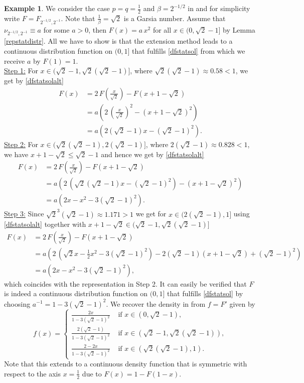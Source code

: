 \documentclass[12pt]{amsart}
\theoremstyle{definition}
\newtheorem{example}[theorem]{Example}
\theoremstyle{remark}
\numberwithin{equation}{section}
\begin{document}
\begin{example}\label{exsymm}
We consider the case $p=q=\frac12$ and $\beta=2^{-1/2}$ in \cite{Sol2} and for simplicity write $F=F_{2^{-1/2},2^{-1}}$. Note that $\frac1{\beta}=\sqrt{2}$ is a Garsia number. Assume that $\nu_{2^{-1/2},2^{-1}}\equiv a$ for some $a>0$, then $F(x)=a\,x^2$ for all $x\in(0,\sqrt{2}-1]$ by Lemma \ref{repstatdistr}. All we have to show is that the extension method leads to a continuous distribution function on $(0,1]$ that fulfills \eqref{dfstatsol} from which we receive $a$ by $F(1)=1$.\\
\underline{Step 1:} For $x\in(\sqrt{2}-1,\sqrt{2}(\sqrt{2}-1)]$, where $\sqrt{2}(\sqrt{2}-1)\approx 0.58<1$, we get by \eqref{dfstatsolalt}
\begin{align*}
F(x) & =2\,F(\tfrac{x}{\sqrt{2}})-F(x+1-\sqrt{2})\\
& =a\left(2\,(\tfrac{x}{\sqrt{2}})^2-(x+1-\sqrt{2})^2\right)\\
& =a\left(2(\sqrt{2}-1)x-(\sqrt{2}-1)^2\right).
\end{align*}
\underline{Step 2:} For $x\in(\sqrt{2}(\sqrt{2}-1),2(\sqrt{2}-1)]$, where $2(\sqrt{2}-1)\approx 0.828<1$, we have $x+1-\sqrt{2}\leq\sqrt{2}-1$ and hence we get by \eqref{dfstatsolalt}
\begin{align*}
F(x) & =2\,F(\tfrac{x}{\sqrt{2}})-F(x+1-\sqrt{2})\\
& =a\left(2\,(\sqrt{2}(\sqrt{2}-1)x-(\sqrt{2}-1)^2)-(x+1-\sqrt{2})^2\right)\\
& =a\left(2x-x^2-3(\sqrt{2}-1)^2\right).
\end{align*}
\underline{Step 3:} Since $\sqrt{2}^3(\sqrt{2}-1)\approx 1.171>1$ we get for $x\in(2(\sqrt{2}-1),1]$ using \eqref{dfstatsolalt} together with $x+1-\sqrt{2}\in(\sqrt{2}-1,\sqrt{2}(\sqrt{2}-1)]$ 
\begin{align*}
F(x) & =2\,F(\tfrac{x}{\sqrt{2}})-F(x+1-\sqrt{2})\\
& =a\left(2\,(\sqrt{2}x-\tfrac12 x^2-3(\sqrt{2}-1)^2)-2(\sqrt{2}-1)(x+1-\sqrt{2})+(\sqrt{2}-1)^2\right)\\
& =a\left(2x-x^2-3(\sqrt{2}-1)^2\right),
\end{align*}
which coincides with the representation in Step 2. It can easily be verified that $F$ is indeed a continuous distribution function on $(0,1]$ that fulfills \eqref{dfstatsol} by choosing $a^{-1}=1-3(\sqrt{2}-1)^2$. We recover the density in \cite{Sol2} from $f=F'$ given by
$$f(x)=\begin{cases}
\frac{2x}{1-3(\sqrt{2}-1)^2} & \text{ if } x\in(0,\sqrt{2}-1),\\
\frac{2(\sqrt{2}-1)}{1-3(\sqrt{2}-1)^2} & \text{ if } x\in(\sqrt{2}-1,\sqrt{2}(\sqrt{2}-1)),\\
\frac{2-2x}{1-3(\sqrt{2}-1)^2} & \text{ if } x\in(\sqrt{2}(\sqrt{2}-1),1).
\end{cases}$$
Note that this extends to a continuous density function that is symmetric with respect to the axis $x=\frac12$ due to $F(x)=1-F(1-x)$.
\end{example}
\end{document}
